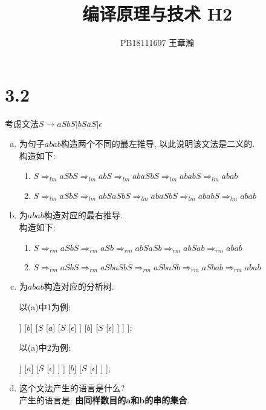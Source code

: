 \documentclass[UTF8]{article}
\title{编译原理与技术 H2}
\date{}
\author{PB18111697 王章瀚}
\begin{document}
\maketitle

\section*{3.2}
\noindent 考虑文法$S\rightarrow aSbS|bSaS|\epsilon$
\begin{enumerate}[(a) ]
\item 为句子$abab$构造两个不同的最左推导, 以此说明该文法是二义的.\\
	构造如下:
	\begin{enumerate}[1. ]
	\item $S \Rightarrow_{lm} aSbS \Rightarrow_{lm} abS \Rightarrow_{lm} abaSbS \Rightarrow_{lm} ababS \Rightarrow_{lm} abab$
	\item $S \Rightarrow_{lm} aSbS \Rightarrow_{lm} abSaSbS \Rightarrow_{lm} abaSbS \Rightarrow_{lm} ababS \Rightarrow_{lm} abab$
	\end{enumerate}
\item 为$abab$构造对应的最右推导.\\
	构造如下:
	\begin{enumerate}[1. ]
	\item $S \Rightarrow_{rm} aSbS \Rightarrow_{rm} aSb \Rightarrow_{rm} abSaSb \Rightarrow_{rm} abSab \Rightarrow_{rm} abab$
	\item $S \Rightarrow_{rm} aSbS \Rightarrow_{rm} aSbaSbS \Rightarrow_{rm} aSbaSb \Rightarrow_{rm} aSbab \Rightarrow_{rm} abab$
	\end{enumerate}
\item 为$abab$构造对应的分析树.\\
	\begin{minipage}{0.5\linewidth}
	以(a)中1为例:\\
	\begin{forest}
	[$S$, for tree={fill=aquamarine}
		[$a$]
		[$S$
			[$\epsilon$]
		]
		[$b$]
		[$S$
			[$a$]
			[$S$
				[$\epsilon$]
			]
			[$b$]
			[$S$
				[$\epsilon$]
			]
		]
	];
	\end{forest}
	\end{minipage}
	\begin{minipage}{0.5\linewidth}
	以(a)中2为例:\\
	\begin{forest}
	[$S$, for tree={fill=aquamarine}
		[$a$]
		[$S$
			[$b$]
			[$S$
				[$\epsilon$]
			]
			[$a$]
			[$S$
				[$\epsilon$]
			]
		]
		[$b$]
		[$S$
			[$\epsilon$]
		]
	];
	\end{forest}
	\end{minipage}
\item 这个文法产生的语言是什么?\\
	产生的语言是: \textbf{由同样数目的$\bm{a}$和$\bm{b}$的串的集合}.
\end{enumerate}
\end{document}
